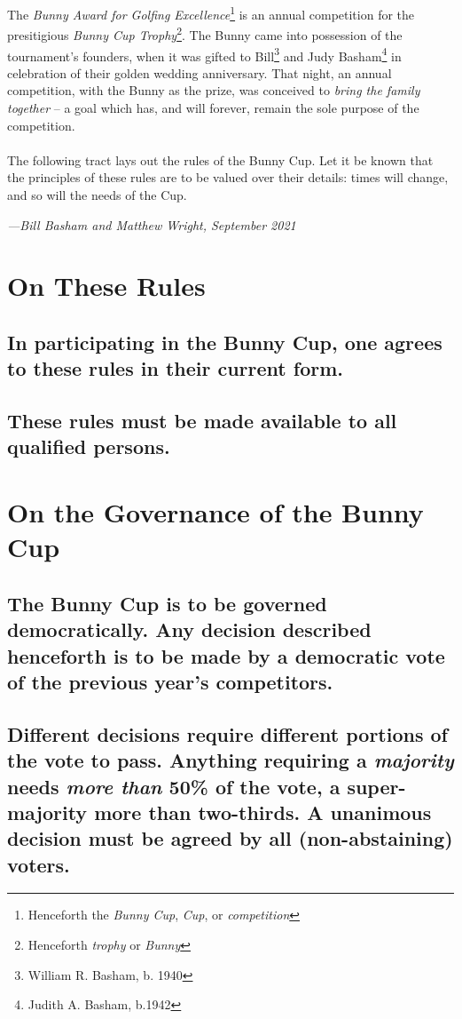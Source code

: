 \documentclass[a4paper]{article}
\begin{document}
The \emph{Bunny Award for Golfing Excellence}\footnote{Henceforth the \emph{Bunny Cup}, \emph{Cup}, or \emph{competition}} is an annual competition for the presitigious \emph{Bunny Cup Trophy}\footnote{Henceforth \emph{trophy} or \emph{Bunny}}. The Bunny came into possession of the tournament's founders, when it was gifted to Bill\footnote{William R. Basham, b. 1940} and Judy Basham\footnote{Judith A. Basham, b.1942} in celebration of their golden wedding anniversary. That night, an annual competition, with the Bunny as the prize, was conceived to \emph{bring the family together} – a goal which has, and will forever, remain the sole purpose of the competition.
\\
\\
The following tract lays out the rules of the Bunny Cup. Let it be known that the principles of these rules are to be valued over their details: times will change, and so will the needs of the Cup.
\\
\begin{flushright}
\emph{—Bill Basham and Matthew Wright, September 2021}
\end{flushright}

\vfill 
\section{On These Rules}
\subsection{In participating in the Bunny Cup, one agrees to these rules in their current form.}\label{ruleagreement}
\subsection{These rules must be made available to all qualified persons.}\label{ruleavailable}



\section{On the Governance of the Bunny Cup}
\subsection{The Bunny Cup is to be governed democratically. Any decision described henceforth is to be made by a democratic vote of the previous year's competitors.}\label{democraticgov}
\subsection{Different decisions require different portions of the vote to pass. Anything requiring a \emph{majority} needs \emph{more than} 50\% of the vote, a super-majority more than two-thirds. A unanimous decision must be agreed by all (non-abstaining) voters.}\label{majorities}
\end{document}
